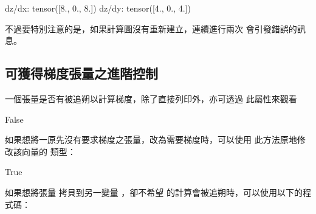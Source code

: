 \documentclass[letterpaper,10pt,english]{sphinxmanual}
\begin{document}
\begin{sphinxVerbatim}[commandchars=\\\{\}]
dz/dx:  tensor([\PYGZhy{}8.,  0.,  8.])
dz/dy:  tensor([\PYGZhy{}4.,  0.,  4.])
\end{sphinxVerbatim}

不過要特別注意的是，如果計算圖沒有重新建立，連續進行兩次  會引發錯誤的訊息。


\subsection{可獲得梯度張量之進階控制}
\label{\detokenize{notebook/lab-torch-diff-opt:id4}}
一個張量是否有被追朔以計算梯度，除了直接列印外，亦可透過  此屬性來觀看

\begin{sphinxVerbatim}[commandchars=\\\{\}]
  \PYG{p}{[}  \PYG{p}{]}
                   
\end{sphinxVerbatim}

\begin{sphinxVerbatim}[commandchars=\\\{\}]
False
\end{sphinxVerbatim}

如果想將一原先沒有要求梯度之張量，改為需要梯度時，可以使用  此方法原地修改該向量的  類型：

\begin{sphinxVerbatim}[commandchars=\\\{\}]
\end{sphinxVerbatim}

\begin{sphinxVerbatim}[commandchars=\\\{\}]
True
\end{sphinxVerbatim}

如果想將張量  拷貝到另一變量 ，卻不希望  的計算會被追朔時，可以使用以下的程式碼：
\end{document}
